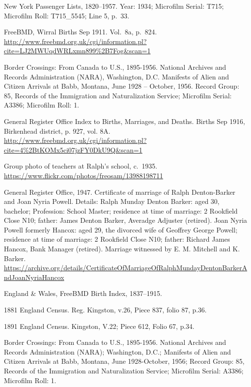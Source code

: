 \begin{thebibliography}{99}
	New York Passenger Lists, 1820--1957. Year: 1934; Microfilm Serial: T715; Microfilm Roll: T715\_5545; Line 5, p.\ 33.

	FreeBMD, Wirral Births Sep 1911. Vol.\ 8a, p.\ 824.
	\url{http://www.freebmd.org.uk/cgi/information.pl?cite=LJ2MWUqdWRLxmn899\%2B7Fog&scan=1}


	Border Crossings: From Canada to U.S., 1895-1956.
	National Archives and Records Administration (NARA), Washington, D.C.
	Manifests of Alien and Citizen Arrivals at Babb, Montana, June 1928 -- October, 1956.
	Record Group: 85, Records of the Immigration and Naturalization Service; Microfilm Serial: A3386; Microfilm Roll: 1.

	General Register Office Index to Births, Marriages, and Deaths.
	Births Sep 1916, Birkenhead district, p. 927, vol. 8A.
	\url{http://www.freebmd.org.uk/cgi/information.pl?cite=4\%2BtKOMx5ci07jzFY0DkU9Q&scan=1}

	Group photo of teachers at Ralph's school, c.\ 1935.
	\url{https://www.flickr.com/photos/freosam/13988198711}

	General Register Office, 1947. Certificate of marriage of Ralph Denton-Barker and Joan Nyria Powell.
	Details: Ralph Munday Denton Barker: aged 30, bachelor; Profession: School Master;
	residence at time of marriage: 2 Rookfield Close N10; father: James Denton Barker, Averadge Adjuster (retired).
	Joan Nyria Powell formerly Hancox: aged 29, the divorced wife of Geoffrey George Powell;
	residence at time of marriage: 2 Rookfield Close N10; father: Richard James Hancox, Bank Manager (retired).
	Marriage witnessed by E. M. Mitchell and K. Barker.
	\url{https://archive.org/details/CertificateOfMarriageOfRalphMundayDentonBarkerAndJoanNyriaHancox}

	England \& Wales, FreeBMD Birth Index, 1837--1915.

	1881 England Census. Reg. Kingston, v.26, Piece 837, folio 87, p.36.

	1891 England Census. Kingston, V.22; Piece 612, Folio 67, p.34.

	Border Crossings: From Canada to U.S., 1895-1956.
	National Archives and Records Administration (NARA); Washington, D.C.; Manifests of Alien and Citizen Arrivals at Babb, Montana, June 1928-October, 1956; Record Group: 85, Records of the Immigration and Naturalization Service; Microfilm Serial: A3386; Microfilm Roll: 1.


\end{thebibliography}
